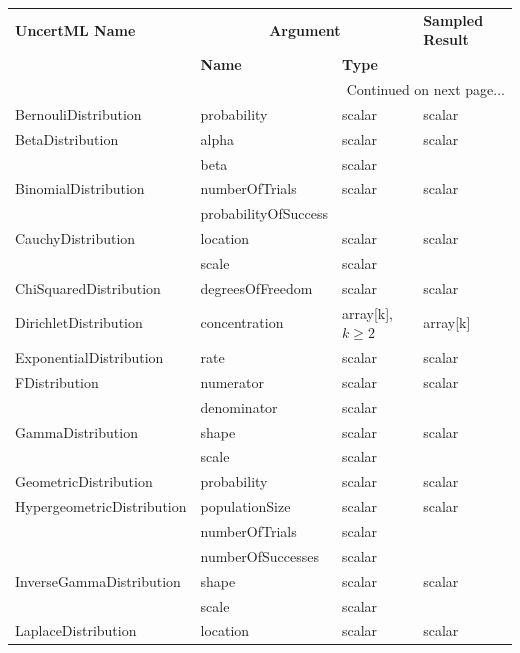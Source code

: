 \documentclass[draftspec]{sbmlpkgspec}
\newcommand{\uncertml}{UncertML\xspace}
\begin{document}
\begin{longtable}[c]{ l l l l }
\toprule
\textbf{\uncertml Name} & \multicolumn{2}{c}{\textbf{Argument}} & \textbf{Sampled Result} \\
\cmidrule(r){2-3}
& \textbf{Name} & \textbf{Type} & \\
\toprule 
\endhead
\cmidrule(r){3-4}
\multicolumn{4}{r}{Continued on next page...}\\
\endfoot
\bottomrule
\endlastfoot
 BernouliDistribution & probability & scalar & scalar \\\midrule
BetaDistribution & alpha & scalar & scalar \\
                          & beta & scalar & \\\midrule
BinomialDistribution & numberOfTrials & scalar & scalar\\
                                 & probabilityOfSuccess & &\\\midrule
CauchyDistribution & location & scalar & scalar \\
                                 & scale & scalar & \\\midrule
ChiSquaredDistribution & degreesOfFreedom & scalar & scalar \\\midrule
DirichletDistribution & concentration & array[k], $k \ge 2$ & array[k] \\\midrule
ExponentialDistribution & rate & scalar & scalar \\\midrule
FDistribution & numerator & scalar & scalar \\
                       & denominator & scalar & \\\midrule
GammaDistribution & shape & scalar & scalar \\
                                & scale & scalar &  \\\midrule
GeometricDistribution & probability & scalar & scalar \\\midrule
HypergeometricDistribution & populationSize & scalar & scalar \\
                                             & numberOfTrials & scalar &\\
                                             & numberOfSuccesses & scalar &\\\midrule
InverseGammaDistribution & shape & scalar & scalar \\
                                & scale & scalar &  \\\midrule
LaplaceDistribution & location & scalar & scalar\\

\end{longtable}
\end{document}
